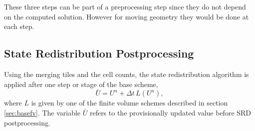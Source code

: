 
These three steps can be part of a preprocessing step since they do not
depend on the computed solution. However for moving geometry they would
be done at each step.

\vspace*{.1in}
\subsection{State Redistribution Postprocessing }
Using the merging tiles and the cell counts, the  state redistribution
algorithm is applied after one step or stage of the base scheme,
$$
\bar{U} = U^n + \Delta t \, L(U^n),
$$
where $L$ is given by one of the finite volume schemes
described in section \ref{sec:basefv}. The variable $\bar{U}$ refers to the
provisionally updated value before SRD postprocessing.

